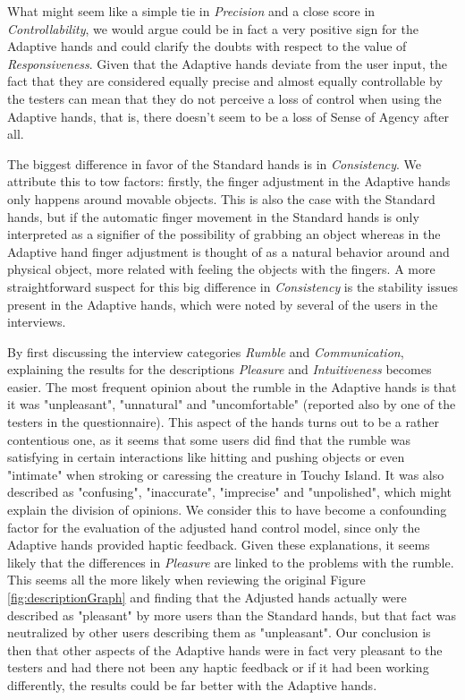 What might seem like a simple tie in \textit{Precision} and a close score in \textit{Controllability}, we would argue could be in fact a very positive sign for the Adaptive hands and could clarify the doubts with respect to the value of \textit{Responsiveness}. Given that the Adaptive hands deviate from the user input, the fact that they are considered equally precise and almost equally controllable by the testers can mean that they do not perceive a loss of control when using the Adaptive hands, that is, there doesn't seem to be a loss of Sense of Agency after all.

The biggest difference in favor of the Standard hands is in \textit{Consistency}. We attribute this to tow factors: firstly, the finger adjustment in the Adaptive hands only happens around movable objects. This is also the case with the Standard hands, but if the automatic finger movement in the Standard hands is only interpreted as a signifier of the possibility of grabbing an object whereas in the Adaptive hand finger adjustment is thought of as a natural behavior around and physical object, more related with feeling the objects with the fingers. A more straightforward suspect for this big difference in \textit{Consistency} is the stability issues present in the Adaptive hands, which were noted by several of the users in the interviews.

By first discussing the interview categories \textit{Rumble} and \textit{Communication}, explaining the results for the descriptions \textit{Pleasure} and \textit{Intuitiveness} becomes easier. The most frequent opinion about the rumble in the Adaptive hands is that it was "unpleasant", "unnatural" and "uncomfortable" (reported also by one of the testers in the questionnaire). This aspect of the hands turns out to be a rather contentious one, as it seems that some users did find that the rumble was satisfying in certain interactions like hitting and pushing objects or even "intimate" when stroking or caressing the creature in Touchy Island. It was also described as "confusing", "inaccurate", "imprecise" and "unpolished", which might explain the division of opinions. We consider this to have become a confounding factor for the evaluation of the adjusted hand control model, since only the Adaptive hands provided haptic feedback. Given these explanations, it seems likely that the differences in \textit{Pleasure} are linked to the problems with the rumble. This seems all the more likely when reviewing the original Figure \ref{fig:descriptionGraph} and finding that the Adjusted hands actually were described as "pleasant" by more users than the Standard hands, but that fact was neutralized by other users describing them as "unpleasant". Our conclusion is then that other aspects of the Adaptive hands were in fact very pleasant to the testers and had there not been any haptic feedback or if it had been working differently, the results could be far better with the Adaptive hands.


